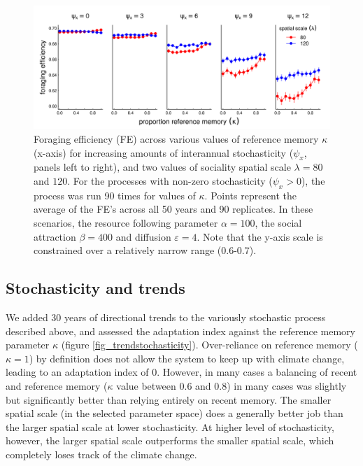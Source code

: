 \documentclass[utf8]{frontiersSCNS} %
\begin{document}
	\begin{figure}
		\includegraphics[width=\textwidth]{figures/stochasticity.png}
		
		\caption{\label{fig_stochasticity} Foraging efficiency (FE) across various values of reference memory $\kappa$ (x-axis) for increasing amounts of interannual stochasticity ($\psi_x$, panels left to right), and two values of sociality spatial scale $\lambda = 80$ and $120$. For the processes with non-zero stochasticity ($\psi_x > 0$), the process was run 90 times for values of $\kappa$. Points represent the average of the FE's across all 50 years and 90 replicates. In these scenarios, the resource following parameter $\alpha = 100$, the social attraction $\beta = 400$ and diffusion $\varepsilon = 4$. Note that the y-axis scale is constrained over a relatively narrow range (0.6-0.7). } 
		
	\end{figure}
	

\subsection{Stochasticity and trends}
	
	We added 30 years of directional trends to the variously stochastic process described above, and assessed the adaptation index against the reference memory parameter $\kappa$ (figure \ref{fig_trendstochasticity}). Over-reliance on reference memory ($\kappa = 1$) by definition does not allow the system to keep up with climate change, leading to an adaptation index of 0. However, in many cases a balancing of recent and reference memory ($\kappa$ value between 0.6 and 0.8) in many cases was slightly but significantly better than relying entirely on recent memory. The smaller spatial scale (in the selected parameter space) does a generally better job than the larger spatial scale at lower stochasticity. At higher level of stochasticity, however, the larger spatial scale outperforms the smaller spatial scale, which completely loses track of the climate change.
	
\end{document}

